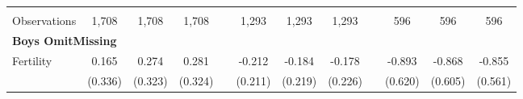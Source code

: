 \begin{landscape}
\begin{table}[htpb!]
\begin{center}
\begin{tabular}{lcccp{2mm}cccp{2mm}ccc}
\begin{footnotesize}\end{footnotesize}&\begin{footnotesize}\end{footnotesize}&\begin{footnotesize}\end{footnotesize}&\begin{footnotesize}\end{footnotesize}&\begin{footnotesize}\end{footnotesize}&\begin{footnotesize}\end{footnotesize}&\begin{footnotesize}\end{footnotesize}&\begin{footnotesize}\end{footnotesize}&\begin{footnotesize}\end{footnotesize}&\begin{footnotesize}\end{footnotesize}&\begin{footnotesize}\end{footnotesize}&\begin{footnotesize}\end{footnotesize}\\Observations&1,708&1,708&1,708&&1,293&1,293&1,293&&596&596&596\\
\multicolumn{12}{l}{\textbf{Boys OmitMissing}}\\ 
Fertility&0.165&0.274&0.281&&-0.212&-0.184&-0.178&&-0.893&-0.868&-0.855\\
&(0.336)&(0.323)&(0.324)&&(0.211)&(0.219)&(0.226)&&(0.620)&(0.605)&(0.561)\\

\end{tabular}
\end{center}
\end{table}
\end{landscape}
